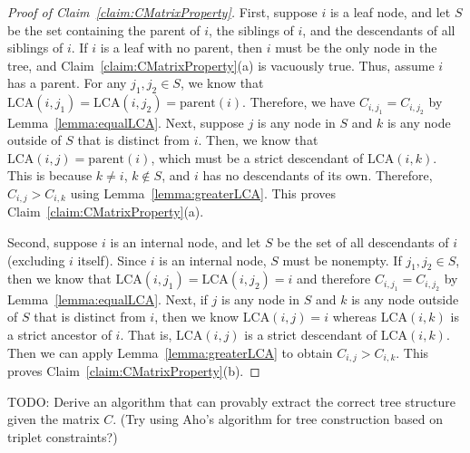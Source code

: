\documentclass{article}
\theoremstyle{definition}
\begin{document}
\begin{proof}[Proof of Claim~\ref{claim:CMatrixProperty}]
First, suppose $i$ is a leaf node, and let $S$ be the set containing the parent of $i$, the siblings of $i$, and the descendants of all siblings of $i$.
If $i$ is a leaf with no parent, then $i$ must be the only node in the tree, and Claim~\ref{claim:CMatrixProperty}(a) is vacuously true.
Thus, assume $i$ has a parent.
For any $j_1, j_2 \in S$, we know that $\text{LCA}(i, j_1) = \text{LCA}(i, j_2) = \text{parent}(i)$.
Therefore, we have $C_{i,j_1} = C_{i,j_2}$ by Lemma~\ref{lemma:equalLCA}.
Next, suppose $j$ is any node in $S$ and $k$ is any node outside of $S$ that is distinct from $i$.
Then, we know that $\text{LCA}(i,j) = \text{parent}(i)$, which must be a strict descendant of $\text{LCA}(i,k)$.
This is because $k \neq i$, $k \notin S$, and $i$ has no descendants of its own.
Therefore, $C_{i,j} > C_{i,k}$ using Lemma~\ref{lemma:greaterLCA}.
This proves Claim~\ref{claim:CMatrixProperty}(a).

Second, suppose $i$ is an internal node, and let $S$ be the set of all descendants of $i$ (excluding $i$ itself).
Since $i$ is an internal node, $S$ must be nonempty.
If $j_1, j_2 \in S$, then we know that $\text{LCA}(i, j_1) = \text{LCA}(i, j_2) = i$ and therefore $C_{i,j_1} = C_{i,j_2}$ by Lemma~\ref{lemma:equalLCA}.
Next, if $j$ is any node in $S$ and $k$ is any node outside of $S$ that is distinct from $i$, then we know $\text{LCA}(i,j) = i$ whereas $\text{LCA}(i,k)$ is a strict ancestor of $i$.
That is, $\text{LCA}(i,j)$ is a strict descendant of $\text{LCA}(i,k)$.
Then we can apply Lemma~\ref{lemma:greaterLCA} to obtain $C_{i,j} > C_{i,k}$.
This proves Claim~\ref{claim:CMatrixProperty}(b).
\end{proof}

TODO: Derive an algorithm that can provably extract the correct tree structure given the matrix $C$.
(Try using Aho's algorithm for tree construction based on triplet constraints?)
\end{document}
